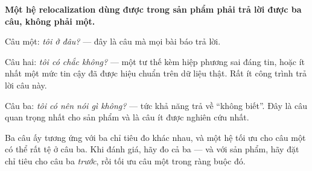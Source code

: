 \documentclass[../../vslam.tex]{subfiles}
\begin{document}
\begin{cannho}
\textbf{Một hệ relocalization dùng được trong sản phẩm phải trả lời được ba câu, không phải một.}

Câu một: \emph{tôi ở đâu?} --- đây là câu mà mọi bài báo trả lời.

Câu hai: \emph{tôi có chắc không?} --- một tư thế kèm hiệp phương sai đáng tin, hoặc ít nhất một mức tin cậy đã được hiệu chuẩn trên dữ liệu thật. Rất ít công trình trả lời câu này.

Câu ba: \emph{tôi có nên nói gì không?} --- tức khả năng trả về ``không biết''. Đây là câu quan trọng nhất cho sản phẩm và là câu ít được nghiên cứu nhất.

Ba câu ấy tương ứng với ba chỉ tiêu đo khác nhau, và một hệ tối ưu cho câu một có thể rất tệ ở câu ba. Khi đánh giá, hãy đo cả ba --- và với sản phẩm, hãy đặt chỉ tiêu cho câu ba \emph{trước}, rồi tối ưu câu một trong ràng buộc đó.
\end{cannho}

\begin{ungdung}
\end{ungdung}
\end{document}
